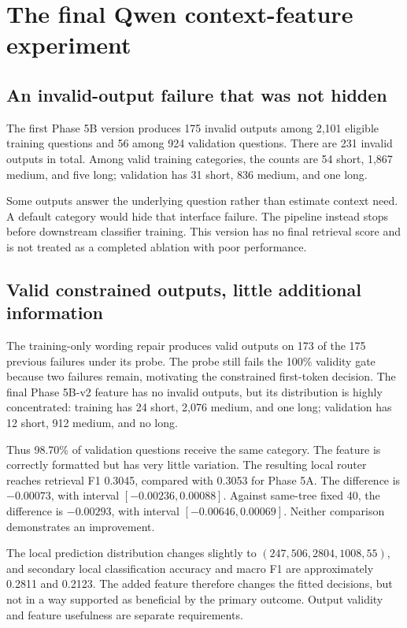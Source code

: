 \section{The final Qwen context-feature experiment}
\subsection{An invalid-output failure that was not hidden}
The first Phase 5B version produces 175 invalid outputs among
2,101 eligible training questions and 56 among 924 validation
questions. There are 231 invalid outputs in total. Among valid
training categories, the counts are 54 short, 1,867 medium, and
five long; validation has 31 short, 836 medium, and one long.

Some outputs answer the underlying question rather than estimate
context need. A default category would hide that interface failure.
The pipeline instead stops before downstream classifier training.
This version has no final retrieval score and is not treated as
a completed ablation with poor performance.

\subsection{Valid constrained outputs, little additional information}
The training-only wording repair produces valid outputs on 173 of the
175 previous failures under its probe. The probe still fails the
100\% validity gate because two failures remain, motivating
the constrained first-token decision. The final Phase 5B-v2
feature has no invalid outputs, but its distribution is highly
concentrated: training has 24 short, 2,076 medium, and one long;
validation has 12 short, 912 medium, and no long.

Thus 98.70\% of validation questions receive the same category.
The feature is correctly formatted but has very little variation.
The resulting local router reaches retrieval F1 0.3045, compared
with 0.3053 for Phase 5A. The difference is $-0.00073$, with
interval $[-0.00236,0.00088]$. Against same-tree fixed 40, the
difference is $-0.00293$, with interval $[-0.00646,0.00069]$.
Neither comparison demonstrates an improvement.

The local prediction distribution changes slightly to
$(247,506,2804,1008,55)$, and secondary local classification
accuracy and macro F1 are approximately 0.2811 and 0.2123.
The added feature therefore changes the fitted decisions, but
not in a way supported as beneficial by the primary outcome.
Output validity and feature usefulness are separate requirements.

